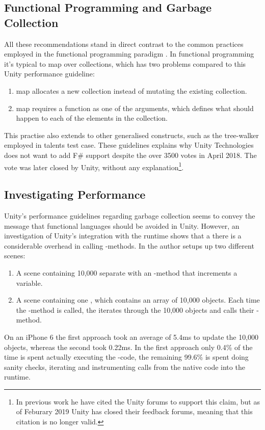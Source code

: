\subsection{Functional Programming and Garbage Collection}
All these recommendations stand in direct contrast to the common practices employed in the functional programming paradigm \needcite. In functional programming it's typical to map over collections, which has two problems compared to this Unity performance guideline:
\begin{enumerate}
    \item map allocates a new collection instead of mutating the existing collection.
    \item map requires a function as one of the arguments, which defines what should happen to each of the elements in the collection.
\end{enumerate}
This practise also extends to other generalised constructs, such as the tree-walker employed in talents test case. These guidelines explains why Unity Technologies does not want to add F\# support despite the over 3500 votes in April 2018\cite{unity:fsharp}. The vote was later closed by Unity, without any explanation\footnote{In previous work \cite{p92018gameplay} he have cited the Unity forums to support this claim, but as of Feburary 2019 Unity has closed their feedback forums, meaning that this citation is no longer valid.}.

\subsection{Investigating Performance}
Unity's performance guidelines regarding garbage collection seems to convey the message that functional languages should be avoided in Unity. However, an investigation of Unity's integration with the runtime shows that a there is a considerable overhead in calling -methods\cite{unity:runtime:calls}. In \cite{unity:runtime:calls} the author setups up two different scenes:
\begin{enumerate}
    \item A scene containing 10,000 separate  with an -method that increments a variable.
    \item A scene containing one , which contains an array of 10,000 objects. Each time the -method is called, the  iterates through the 10,000 objects and calls their -method.
\end{enumerate}
On an iPhone 6 the first approach took an average of 5.4ms to update the 10,000 objects, whereas the second took 0.22ms\cite{unity:runtime:calls}. In the first approach only 0.4\% of the time is spent actually executing the -code, the remaining 99.6\% is spent doing sanity checks, iterating  and instrumenting calls from the native code into the runtime. 

